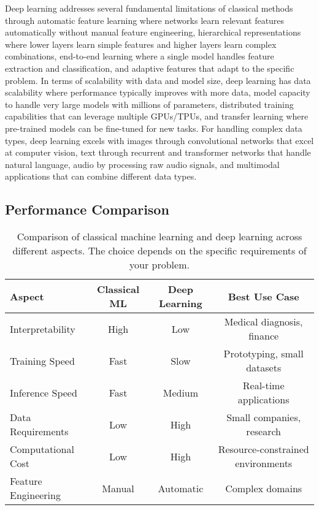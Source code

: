 Deep learning addresses several fundamental limitations of classical methods through automatic feature learning where networks learn relevant features automatically without manual feature engineering, hierarchical representations where lower layers learn simple features and higher layers learn complex combinations, end-to-end learning where a single model handles feature extraction and classification, and adaptive features that adapt to the specific problem. In terms of scalability with data and model size, deep learning has data scalability where performance typically improves with more data, model capacity to handle very large models with millions of parameters, distributed training capabilities that can leverage multiple GPUs/TPUs, and transfer learning where pre-trained models can be fine-tuned for new tasks. For handling complex data types, deep learning excels with images through convolutional networks that excel at computer vision, text through recurrent and transformer networks that handle natural language, audio by processing raw audio signals, and multimodal applications that can combine different data types.

\subsection{Performance Comparison}

\begin{table}[htbp]
\centering
\begin{tabular}{lccc}
\toprule
Aspect & Classical ML & Deep Learning & Best Use Case \\
\midrule
Interpretability & High & Low & Medical diagnosis, finance \\
Training Speed & Fast & Slow & Prototyping, small datasets \\
Inference Speed & Fast & Medium & Real-time applications \\
Data Requirements & Low & High & Small companies, research \\
Computational Cost & Low & High & Resource-constrained environments \\
Feature Engineering & Manual & Automatic & Complex domains \\
\bottomrule
\end{tabular}
\caption{Comparison of classical machine learning and deep learning across different aspects. The choice depends on the specific requirements of your problem.}
\label{tab:ml-vs-dl-comparison}
\end{table}

